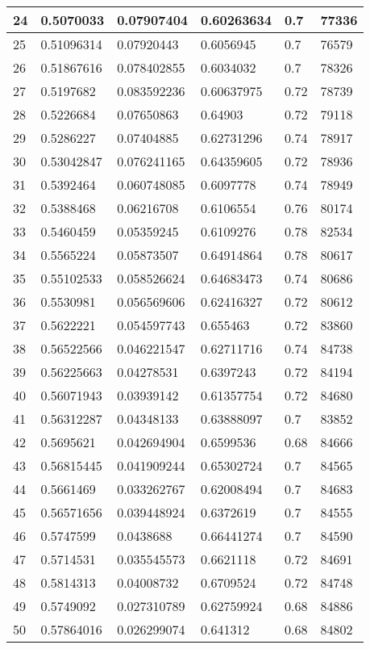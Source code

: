 \begin{longtable}{|l|l|l|l|l|l|}
24 & 0.5070033 & 0.07907404 & 0.60263634 & 0.7 & 77336 \\ \hline 
25 & 0.51096314 & 0.07920443 & 0.6056945 & 0.7 & 76579 \\ \hline 
26 & 0.51867616 & 0.078402855 & 0.6034032 & 0.7 & 78326 \\ \hline 
27 & 0.5197682 & 0.083592236 & 0.60637975 & 0.72 & 78739 \\ \hline 
28 & 0.5226684 & 0.07650863 & 0.64903 & 0.72 & 79118 \\ \hline 
29 & 0.5286227 & 0.07404885 & 0.62731296 & 0.74 & 78917 \\ \hline 
30 & 0.53042847 & 0.076241165 & 0.64359605 & 0.72 & 78936 \\ \hline 
31 & 0.5392464 & 0.060748085 & 0.6097778 & 0.74 & 78949 \\ \hline 
32 & 0.5388468 & 0.06216708 & 0.6106554 & 0.76 & 80174 \\ \hline 
33 & 0.5460459 & 0.05359245 & 0.6109276 & 0.78 & 82534 \\ \hline 
34 & 0.5565224 & 0.05873507 & 0.64914864 & 0.78 & 80617 \\ \hline 
35 & 0.55102533 & 0.058526624 & 0.64683473 & 0.74 & 80686 \\ \hline 
36 & 0.5530981 & 0.056569606 & 0.62416327 & 0.72 & 80612 \\ \hline 
37 & 0.5622221 & 0.054597743 & 0.655463 & 0.72 & 83860 \\ \hline 
38 & 0.56522566 & 0.046221547 & 0.62711716 & 0.74 & 84738 \\ \hline 
39 & 0.56225663 & 0.04278531 & 0.6397243 & 0.72 & 84194 \\ \hline 
40 & 0.56071943 & 0.03939142 & 0.61357754 & 0.72 & 84680 \\ \hline 
41 & 0.56312287 & 0.04348133 & 0.63888097 & 0.7 & 83852 \\ \hline 
42 & 0.5695621 & 0.042694904 & 0.6599536 & 0.68 & 84666 \\ \hline 
43 & 0.56815445 & 0.041909244 & 0.65302724 & 0.7 & 84565 \\ \hline 
44 & 0.5661469 & 0.033262767 & 0.62008494 & 0.7 & 84683 \\ \hline 
45 & 0.56571656 & 0.039448924 & 0.6372619 & 0.7 & 84555 \\ \hline 
46 & 0.5747599 & 0.0438688 & 0.66441274 & 0.7 & 84590 \\ \hline 
47 & 0.5714531 & 0.035545573 & 0.6621118 & 0.72 & 84691 \\ \hline 
48 & 0.5814313 & 0.04008732 & 0.6709524 & 0.72 & 84748 \\ \hline 
49 & 0.5749092 & 0.027310789 & 0.62759924 & 0.68 & 84886 \\ \hline 
50 & 0.57864016 & 0.026299074 & 0.641312 & 0.68 & 84802 \\ \hline 
\end{longtable}